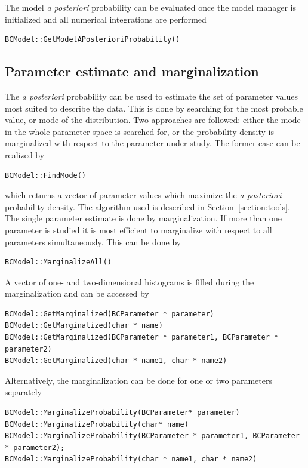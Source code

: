 \documentclass[11pt, a4paper]{article}
\begin{document}
\noindent 
The model {\it a posteriori} probability can be evaluated once the
model manager is initialized and all numerical integrations are
performed
%
\begin{verbatim}
BCModel::GetModelAPosterioriProbability()
\end{verbatim}


\subsection{Parameter estimate and marginalization} 

The {\it a posteriori} probability can be used to estimate the set of
parameter values most suited to describe the data. This is done by
searching for the most probable value, or mode of the
distribution. Two approaches are followed: either the mode in the
whole parameter space is searched for, or the probability density is
marginalized with respect to the parameter under study. The former
case can be realized by 
%
\begin{verbatim} 
BCModel::FindMode()
\end{verbatim} 

\noindent 
which returns a vector of parameter values which maximize the {\it a
posteriori} probability density. The algorithm used is described in
Section~\ref{section:tools}. \\ 

\noindent 
The single parameter estimate is done by marginalization. If more than
one parameter is studied it is most efficient to marginalize with
respect to all parameters simultaneously. This can be done by
%
\begin{verbatim}
BCModel::MarginalizeAll() 
\end{verbatim} 

\noindent 
A vector of one- and two-dimensional histograms is filled during the
marginalization and can be accessed by
%
\begin{verbatim}
BCModel::GetMarginalized(BCParameter * parameter) 
BCModel::GetMarginalized(char * name) 
BCModel::GetMarginalized(BCParameter * parameter1, BCParameter * parameter2) 
BCModel::GetMarginalized(char * name1, char * name2) 
\end{verbatim}

\noindent 
Alternatively, the marginalization can be done for one or two
parameters separately
%
\begin{verbatim}
BCModel::MarginalizeProbability(BCParameter* parameter)
BCModel::MarginalizeProbability(char* name) 
BCModel::MarginalizeProbability(BCParameter * parameter1, BCParameter * parameter2);
BCModel::MarginalizeProbability(char * name1, char * name2)
\end{verbatim} 
\end{document}
